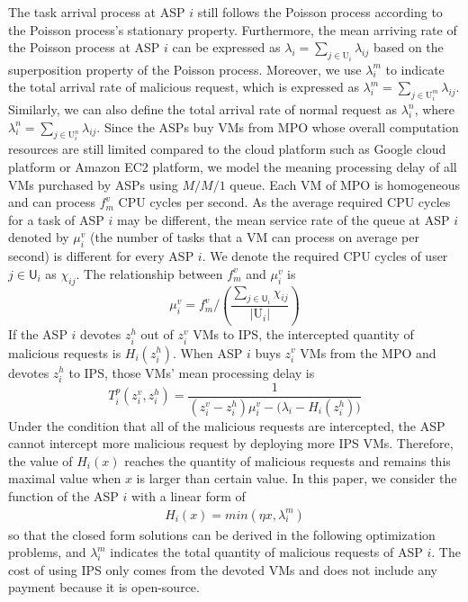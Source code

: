 \documentclass[conference]{IEEEtran}
\begin{document}
The task arrival process at ASP $i$ still follows the Poisson process according to the Poisson process's stationary property. Furthermore, the mean arriving rate of the Poisson process at ASP $i$ can be expressed as $\lambda_i = \sum_{j \in \mathrm{U}_i} \lambda_{ij}$ based on the superposition property of the Poisson process. Moreover, we use $\lambda_i^m$ to indicate the total arrival rate of malicious request, which is expressed as $\lambda_i^m = \sum_{j \in \mathrm{U}_i^m} \lambda_{ij}$. Similarly, we can also define the total arrival rate of normal request as $\lambda_i^n$, where $\lambda_i^n =  \sum_{j \in \mathrm{U}_i^n} \lambda_{ij}$. Since the ASPs buy VMs from MPO whose overall computation resources are still limited compared to the cloud platform such as Google cloud platform or Amazon EC2 platform, we model the meaning processing delay of all VMs purchased by ASPs using $M/M/1$ queue. Each VM of MPO is homogeneous and can process $f_m^v$ CPU cycles per second. As the average required CPU cycles for a task of ASP $i$ may be different, the mean service rate of the queue at ASP $i$ denoted by $\mu_i^v$ (the number of tasks that a VM can process on average per second) is different for every ASP $i$. We denote the required CPU cycles of user $j \in \mathsf{U}_i$ as $\chi_{ij}$. The relationship between $f_m^v$ and $\mu_i^v$ is
\begin{equation}\label{eqn:service_rate}
\mu_i^v = f_m^v/(\frac{\sum_{j \in \mathsf{U}_i} \chi_{ij}}{|\mathrm{U}_i|})
\end{equation}
If the ASP $i$ devotes $z_i^h$ out of $z_i^v$ VMs to IPS, the intercepted quantity of malicious requests is $H_i(z_i^h)$. When ASP $i$ buys $z_i^v$ VMs from the MPO and devotes $z_i^h$ to IPS, those VMs' mean processing delay is
\begin{equation} \label{eqn:asp_mm1_delay}
T_i^p(z_i^v, z_i^h) = \frac{1}{(z_i^v - z_i^h)\mu_i^v - \big(\lambda_i - H_i(z_i^h)\big)}
\end{equation}
Under the condition that all of the malicious requests are intercepted, the ASP cannot intercept more malicious request by deploying more IPS VMs. Therefore, the value of $H_i(x)$ reaches the quantity of malicious requests and remains this maximal value when $x$ is larger than certain value. In this paper, we consider the function of the ASP $i$ with a linear form of
\begin{equation}
\begin{aligned}
    H_i(x) = min(\eta{x}, \lambda_i^m)
\end{aligned}
\end{equation}
so that the closed form solutions can be derived in the following optimization problems, and $\lambda_i^m$ indicates the total quantity of malicious requests of ASP $i$. The cost of using IPS only comes from the devoted VMs and does not include any payment because it is open-source.
\end{document}
